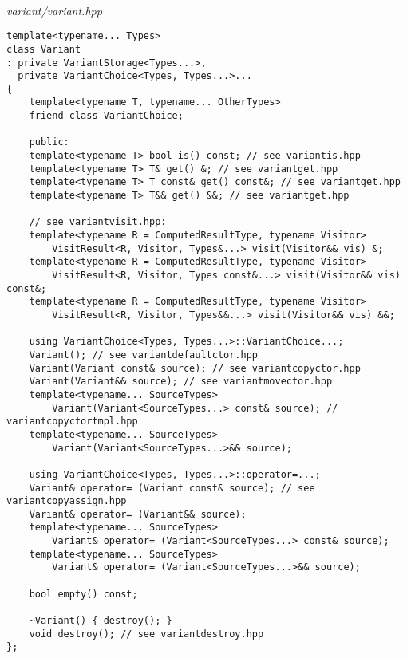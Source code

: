 \hspace*{\fill} \\ %
\noindent
\textit{variant/variant.hpp}
\begin{lstlisting}[style=styleCXX]
template<typename... Types>
class Variant
: private VariantStorage<Types...>,
  private VariantChoice<Types, Types...>...
{
	template<typename T, typename... OtherTypes>
	friend class VariantChoice;
	
	public:
	template<typename T> bool is() const; // see variantis.hpp
	template<typename T> T& get() &; // see variantget.hpp
	template<typename T> T const& get() const&; // see variantget.hpp
	template<typename T> T&& get() &&; // see variantget.hpp
	
	// see variantvisit.hpp:
	template<typename R = ComputedResultType, typename Visitor>
		VisitResult<R, Visitor, Types&...> visit(Visitor&& vis) &;
	template<typename R = ComputedResultType, typename Visitor>
		VisitResult<R, Visitor, Types const&...> visit(Visitor&& vis) const&;
	template<typename R = ComputedResultType, typename Visitor>
		VisitResult<R, Visitor, Types&&...> visit(Visitor&& vis) &&;
	
	using VariantChoice<Types, Types...>::VariantChoice...;
	Variant(); // see variantdefaultctor.hpp
	Variant(Variant const& source); // see variantcopyctor.hpp
	Variant(Variant&& source); // see variantmovector.hpp
	template<typename... SourceTypes>
		Variant(Variant<SourceTypes...> const& source); // variantcopyctortmpl.hpp
	template<typename... SourceTypes>
		Variant(Variant<SourceTypes...>&& source);
	
	using VariantChoice<Types, Types...>::operator=...;
	Variant& operator= (Variant const& source); // see variantcopyassign.hpp
	Variant& operator= (Variant&& source);
	template<typename... SourceTypes>
		Variant& operator= (Variant<SourceTypes...> const& source);
	template<typename... SourceTypes>
		Variant& operator= (Variant<SourceTypes...>&& source);
	
	bool empty() const;
	
	~Variant() { destroy(); }
	void destroy(); // see variantdestroy.hpp
};
\end{lstlisting}








